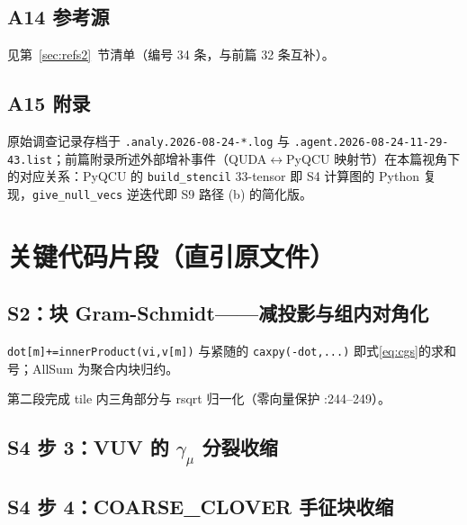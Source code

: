 \documentclass[UTF8]{ctexart}
\begin{document}
\subsection{A14 参考源}

见第~\ref{sec:refs2}~节清单（编号 34 条，与前篇 32 条互补）。

\subsection{A15 附录}

原始调查记录存档于 \texttt{\nolinkurl{.analy.2026-08-24-*.log}} 与 \texttt{\nolinkurl{.agent.2026-08-24-11-29-43.list}}；前篇附录所述外部增补事件（QUDA$\leftrightarrow$PyQCU 映射节）在本篇视角下的对应关系：PyQCU 的 \texttt{build\_stencil} 33-tensor 即 S4 计算图的 Python 复现，\texttt{give\_null\_vecs} 逆迭代即 S9 路径 (b) 的简化版。

\section{关键代码片段（直引原文件）}

\subsection{S2：块 Gram-Schmidt——减投影与组内对角化}


\texttt{dot[m]+=innerProduct(vi,v[m])} 与紧随的 \texttt{caxpy(-dot,...)} 即式\eqref{eq:cgs}的求和号；AllSum 为聚合内块归约。



第二段完成 tile 内三角部分与 rsqrt 归一化（零向量保护 :244--249）。

\subsection{S4 步 3：VUV 的 $\gamma_\mu$ 分裂收缩}


\subsection{S4 步 4：COARSE\_CLOVER 手征块收缩}

\end{document}
